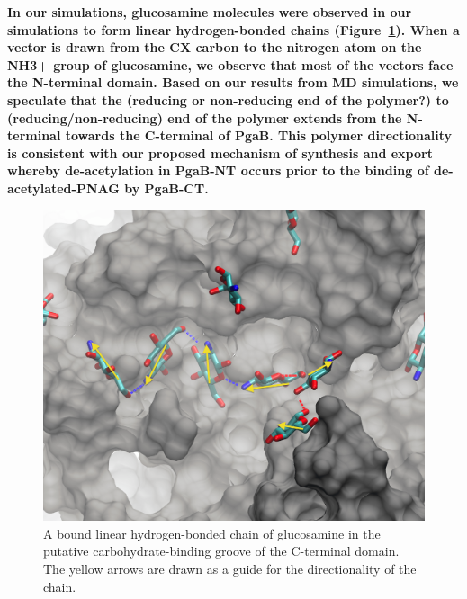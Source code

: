 \textbf{In our simulations, glucosamine molecules were observed in our simulations to form linear hydrogen-bonded chains (Figure~\ref{fig:directionality}). When a vector is drawn from the CX carbon to the nitrogen atom on the NH3+ group of glucosamine, we observe that most of the vectors face the N-terminal domain. Based on our results from MD simulations, we speculate that the (reducing or non-reducing end of the polymer?) to (reducing/non-reducing) end of the polymer extends from the N-terminal towards the C-terminal of PgaB.  This polymer directionality is consistent with our proposed mechanism of synthesis and export whereby de-acetylation in PgaB-NT occurs prior to the binding of de-acetylated-PNAG by PgaB-CT.}

\begin{figure}[htbp]
\centering
\includegraphics[width=6in]{figures/results4/glucosamine_binding_direction_suggestive.png}
\caption[Polymer directionality]{A bound linear hydrogen-bonded chain of glucosamine in the putative carbohydrate-binding groove of the C-terminal domain.  The yellow arrows are drawn as a guide for the directionality of the chain.}
\label{fig:directionality}
\end{figure}


